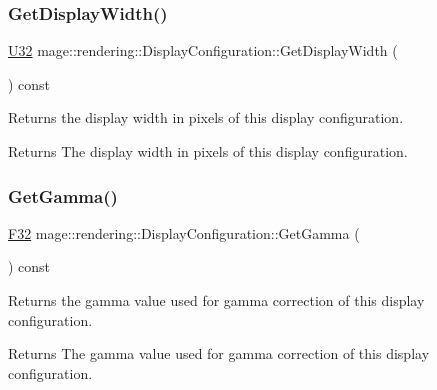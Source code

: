 \subsubsection{\texorpdfstring{Get\+Display\+Width()}{GetDisplayWidth()}}
{\footnotesize\ttfamily \hyperlink{namespacemage_a41c104c036fba3756a74e19f793eeaa1}{U32} mage\+::rendering\+::\+Display\+Configuration\+::\+Get\+Display\+Width (\begin{DoxyParamCaption}{ }\end{DoxyParamCaption}) const\hspace{0.3cm}{\ttfamily [noexcept]}}

Returns the display width in pixels of this display configuration.

\begin{DoxyReturn}{Returns}
The display width in pixels of this display configuration. 
\end{DoxyReturn}
\hypertarget{classmage_1_1rendering_1_1_display_configuration_a84dec99b487839003fce7c9704dc031d}{}\label{classmage_1_1rendering_1_1_display_configuration_a84dec99b487839003fce7c9704dc031d} 
\subsubsection{\texorpdfstring{Get\+Gamma()}{GetGamma()}}
{\footnotesize\ttfamily \hyperlink{namespacemage_aa97e833b45f06d60a0a9c4fc22ae02c0}{F32} mage\+::rendering\+::\+Display\+Configuration\+::\+Get\+Gamma (\begin{DoxyParamCaption}{ }\end{DoxyParamCaption}) const\hspace{0.3cm}{\ttfamily [noexcept]}}

Returns the gamma value used for gamma correction of this display configuration.

\begin{DoxyReturn}{Returns}
The gamma value used for gamma correction of this display configuration. 
\end{DoxyReturn}
\hypertarget{classmage_1_1rendering_1_1_display_configuration_a727b2e5ebcc286bb2ae39fd1f1e69445}{}\label{classmage_1_1rendering_1_1_display_configuration_a727b2e5ebcc286bb2ae39fd1f1e69445} 
